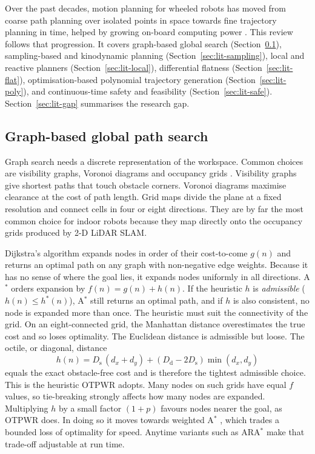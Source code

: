 \documentclass[11pt,a4paper]{article}
\begin{document}
Over the past decades, motion planning for wheeled robots has moved from
coarse path planning over isolated points in space towards fine trajectory
planning in time, helped by growing on-board computing power
\citep{luo2024otpwr,gonzalez2016review}. This review follows that
progression. It covers graph-based global search
(Section~\ref{sec:lit-graph}), sampling-based and kinodynamic planning
(Section~\ref{sec:lit-sampling}), local and reactive planners
(Section~\ref{sec:lit-local}), differential flatness
(Section~\ref{sec:lit-flat}), optimisation-based polynomial trajectory
generation (Section~\ref{sec:lit-poly}), and continuous-time safety and
feasibility (Section~\ref{sec:lit-safe}). Section~\ref{sec:lit-gap}
summarises the research gap.

\subsection{Graph-based global path search}
\label{sec:lit-graph}

Graph search needs a discrete representation of the workspace. Common choices
are visibility graphs, Voronoi diagrams and occupancy grids
\citep{lavalle2006planning}. Visibility graphs give shortest paths that touch
obstacle corners. Voronoi diagrams maximise clearance at the cost of path
length. Grid maps divide the plane at a fixed resolution and connect cells in
four or eight directions. They are by far the most common choice for indoor
robots because they map directly onto the occupancy grids produced by 2-D
LiDAR SLAM.

Dijkstra's algorithm \citep{dijkstra1959note} expands nodes in order of their
cost-to-come $g(n)$ and returns an optimal path on any graph with
non-negative edge weights. Because it has no sense of where the goal lies, it
expands nodes uniformly in all directions. A$^\ast$ \citep{hart1968formal}
orders expansion by $f(n)=g(n)+h(n)$. If the heuristic $h$ is
\emph{admissible} ($h(n)\le h^\ast(n)$), A$^\ast$ still returns an optimal
path, and if $h$ is also consistent, no node is expanded more than once. The
heuristic must suit the connectivity of the grid. On an eight-connected grid,
the Manhattan distance overestimates the true cost and so loses optimality.
The Euclidean distance is admissible but loose. The octile, or diagonal,
distance
\begin{equation}
  h(n)=D_{\mathrm{s}}\,(d_x+d_y)+(D_{\mathrm{d}}-2D_{\mathrm{s}})\min(d_x,d_y)
\end{equation}
equals the exact obstacle-free cost and is therefore the tightest admissible
choice. This is the heuristic OTPWR adopts. Many nodes on such grids have
equal $f$ values, so tie-breaking strongly affects how many nodes are
expanded. Multiplying $h$ by a small factor $(1+p)$ favours nodes nearer the
goal, as OTPWR does. In doing so it moves towards weighted A$^\ast$
\citep{pohl1970heuristic}, which trades a bounded loss of optimality for
speed. Anytime variants such as ARA$^\ast$ \citep{likhachev2003ara} make that
trade-off adjustable at run time.
\end{document}
